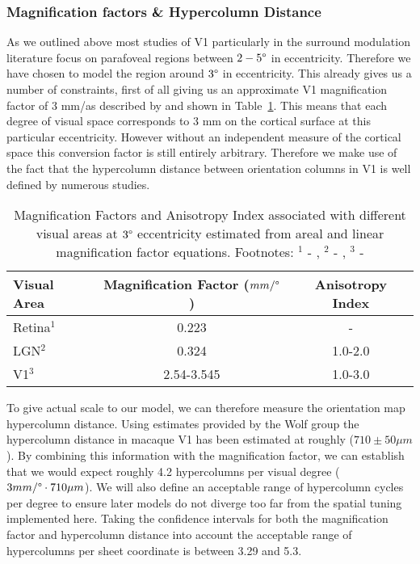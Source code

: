 \subsubsection{Magnification factors \& Hypercolumn Distance} \label{SCALHypercolumns}

As we outlined above most studies of V1 particularly in the surround
modulation literature focus on parafoveal regions between $2-5\degree$
in eccentricity. Therefore we have chosen to model the region around
$3\degree$ in eccentricity. This already gives us a number of
constraints, first of all giving us an approximate V1 magnification
factor of 3 mm/\degree as described by \cite{VanEssen1984} and shown
in Table~\ref{MFs}. This means that each degree of visual space
corresponds to 3 mm on the cortical surface at this particular
eccentricity. However without an independent measure of the cortical
space this conversion factor is still entirely arbitrary. Therefore we
make use of the fact that the hypercolumn distance between orientation
columns in V1 is well defined by numerous studies.

\begin{table}
\centering
\begin{tabular}{l | c c}
  \hline
  \hline
  Visual Area     & Magnification Factor ($mm/\degree$) & Anisotropy Index \\
  \hline
  Retina$^1$      & 0.223                            & -                      \\
  LGN$^2$         & 0.324                             & 1.0-2.0                \\
  V1$^3$          & 2.54-3.545                       & 1.0-3.0                \\
  \hline
\end{tabular}
\caption[]%
{Magnification Factors and Anisotropy Index associated with different
  visual areas at $3\degree$ eccentricity estimated from areal and
  linear magnification factor equations. Footnotes: $^1$ -
  \cite{Perry1985}, $^2$ - \cite{Connolly1984}, $^3$ -
  \cite{VanEssen1984}}
\label{MFs}
\end{table}

To give actual scale to our model, we can therefore measure the
orientation map hypercolumn distance. Using estimates provided by the
Wolf group the hypercolumn distance in macaque V1 has been estimated
at roughly ($710 \pm 50 \mu m$). By combining this information with
the magnification factor, we can establish that we would expect
roughly 4.2 hypercolumns per visual degree ($3 mm/\degree \cdot 710
\mu m$). We will also define an acceptable range of hypercolumn cycles
per degree to ensure later models do not diverge too far from the
spatial tuning implemented here. Taking the confidence intervals for
both the magnification factor and hypercolumn distance into account
the acceptable range of hypercolumns per sheet coordinate is between
3.29 and 5.3.


